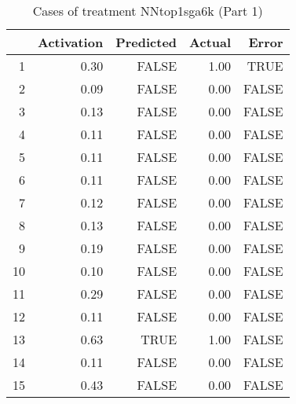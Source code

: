 \begin{table}[ht]
\centering
\begin{tabular}{rrrrr}
  \hline
 & Activation & Predicted & Actual & Error \\ 
  \hline
1 & 0.30 & FALSE & 1.00 & TRUE \\ 
  2 & 0.09 & FALSE & 0.00 & FALSE \\ 
  3 & 0.13 & FALSE & 0.00 & FALSE \\ 
  4 & 0.11 & FALSE & 0.00 & FALSE \\ 
  5 & 0.11 & FALSE & 0.00 & FALSE \\ 
  6 & 0.11 & FALSE & 0.00 & FALSE \\ 
  7 & 0.12 & FALSE & 0.00 & FALSE \\ 
  8 & 0.13 & FALSE & 0.00 & FALSE \\ 
  9 & 0.19 & FALSE & 0.00 & FALSE \\ 
  10 & 0.10 & FALSE & 0.00 & FALSE \\ 
  11 & 0.29 & FALSE & 0.00 & FALSE \\ 
  12 & 0.11 & FALSE & 0.00 & FALSE \\ 
  13 & 0.63 & TRUE & 1.00 & FALSE \\ 
  14 & 0.11 & FALSE & 0.00 & FALSE \\ 
  15 & 0.43 & FALSE & 0.00 & FALSE \\ 
   \hline
\end{tabular}
\caption{Cases of treatment NNtop1sga6k (Part 1)} 
\end{table}
